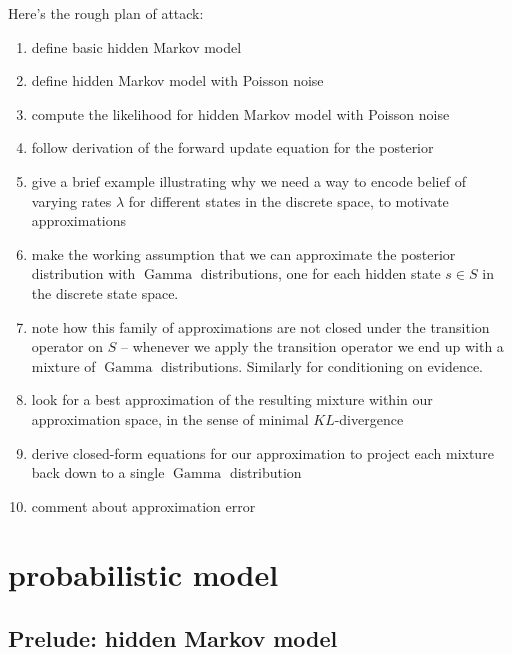 \documentclass[twoside, 11pt]{article}
\DeclareMathOperator*{\gammad}{Gamma}
\begin{document}
Here's the rough plan of attack:
\begin{enumerate}
\item define basic hidden Markov model
\item define hidden Markov model with Poisson noise
\item compute the likelihood for hidden Markov model with Poisson noise
\item follow \citet*{russell2002artificial} derivation of the forward update equation for the posterior
\item give a brief example illustrating why we need a way to encode belief of varying rates $\lambda$ for different states in the discrete space, to motivate approximations
\item make the working assumption that we can approximate the posterior distribution with $\gammad$ distributions, one for each hidden state $s \in S$ in the discrete state space.
\item note how this family of approximations are not closed under the transition operator on $S$ -- whenever we apply the transition operator we end up with a mixture of $\gammad$ distributions. Similarly for conditioning on evidence.
\item look for a best approximation of the resulting mixture within our approximation space, in the sense of minimal $KL$-divergence
\item derive closed-form equations for our approximation to project each mixture back down to a single $\gammad$ distribution
\item comment about approximation error
\end{enumerate}



\section{probabilistic model}
\subsection{Prelude: hidden Markov model}
\end{document}

